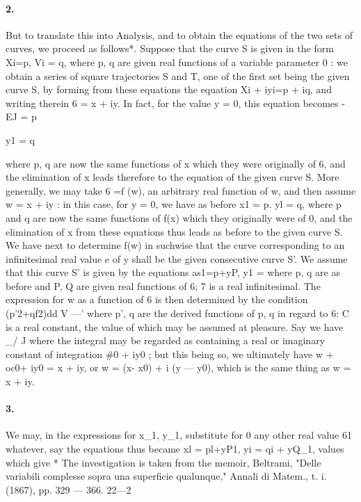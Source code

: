 \documentclass[11pt,a4paper]{book}
\begin{document}
{{{{{{{{\paragraph{2.} But  to  translate  this  into  Analysis,  and  to  obtain  the  equations  of  the  two
sets  of  curves,  we  proceed  as  follows*.
Suppose  that  the  curve  S  is  given  in  the  form
Xi=p,   Vi  =  q,
where  p,  q  are  given  real  functions  of  a  variable  parameter  0  :  we  obtain  a  series  of
square  trajectories  S  and  T,  one  of  the  first  set  being  the  given  curve  S,  by  forming
from  these  equations  the  equation
Xi  +  iyi=p  +  iq,
and  writing  therein  6  =  x  +  iy.  In  fact,  for  the  value  y  =  0,  this  equation  becomes
-EJ  =  p}  y1  =  q}  where  p,  q  are  now  the  same  functions  of  x  which  they  were  originally
of  6,  and  the  elimination  of  x  leads  therefore  to  the  equation  of  the  given  curve  S.
More  generally,  we  may  take  6  =f  (w),  an  arbitrary  real  function  of  w,  and  then
assume  w  =  x  +  iy  :  in  this  case,  for  y  =  0,  we  have  as  before  x1  =  p.  yl  =  q,  where
p  and  q  are  now  the  same  functions  of  f(x)  which  they  originally  were  of  0,  and
the  elimination  of  x  from  these  equations  thus  leads  as  before  to  the  given  curve  S.
We  have  next  to  determine  f(w)  in  suchwise  that  the  curve  corresponding  to
an  infinitesimal  real  value  e  of  y  shall  be  the  given  consecutive  curve  S'.  We
assume  that  this  curve  S'  is  given  by  the  equations
as1=p+yP,     y1  =
where  p,  q  are  as  before  and  P,  Q  are  given  real  functions  of  6;  7  is  a  real
infinitesimal.  The  expression  for  w  as  a  function  of  6  is  then  determined  by  the
condition
        (p'2+qf2)dd
V  ---'
where  p',   q    are   the   derived   functions   of  p,   q   in   regard   to    6:    C  is  a  real  constant,
the  value  of  which  may  be  assumed  at  pleasure.     Say  we  have
\_/
J
where   the   integral   may   be   regarded    as    containing    a    real    or    imaginary   constant    of
integration  \#0  +  iy0  ;   but  this  being  so,  we  ultimately  have
w  +  oc0+  iy0  =  x  +  iy,     or     w  =  (x-  x0)  +  i  (y  ---  y0),
which  is  the  same  thing  as  w  =  x  +  iy.
\paragraph{3.} We  may,  in  the  expressions  for  x_1,  y_1,  substitute  for  0  any  other  real  value
61  whatever,  say  the  equations  thus  became  xl  =  pl+yP1,  yi  =  qi  +  yQ_1,  values  which
give
*  The  investigation  is  taken   from   the   memoir,  Beltrami,    "Delle   variabili   complesse   sopra  una    superficie
qualunque,"  Annali  di  Matem.,  t.  i.  (1867),  pp.  329  ---  366.
22---2


}}}}}}
\end{document}

